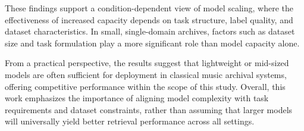 \documentclass{article}
\begin{document}
These findings support a condition-dependent view of model scaling, where the effectiveness of increased capacity depends on task structure, label quality, and dataset characteristics. In small, single-domain archives, factors such as dataset size and task formulation play a more significant role than model capacity alone.

From a practical perspective, the results suggest that lightweight or mid-sized models are often sufficient for deployment in classical music archival systems, offering competitive performance within the scope of this study.
Overall, this work emphasizes the importance of aligning model complexity with task requirements and dataset constraints, rather than assuming that larger models will universally yield better retrieval performance across all settings.



\end{document}
